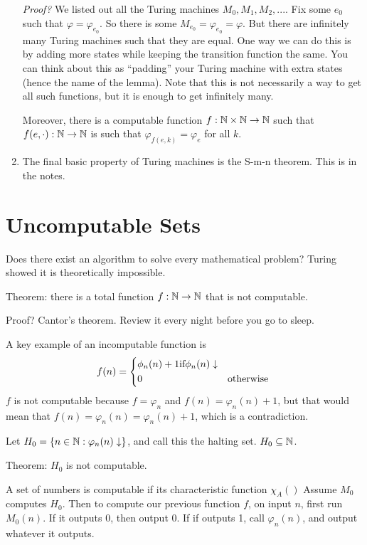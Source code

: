 \begin{enumerate}
    \textit{Proof?} We listed out all the Turing machines $M_0, M_1, M_2, ...$.
    Fix some $e_0$ such that $\varphi = \varphi_{e_0}$.
    So there is some $M_{e_0} = \varphi_{e_0} = \varphi$.
    But there are infinitely many Turing machines such that they are equal.
    One way we can do this is by adding more states while keeping the transition function the same.
    You can think about this as ``padding'' your Turing machine with extra states (hence the name of the lemma).
    Note that this is not necessarily a way to get all such functions, but it is enough to get infinitely many.

    Moreover, there is a computable function $f : \mathbb N \times \mathbb N \to \mathbb N$ such that $f(e, \cdot) : \mathbb N \to \mathbb N$ is such that $\varphi_{f(e, k)} = \varphi_e$ for all $k$.

    \item The final basic property of Turing machines is the S-m-n theorem.
    This is in the notes.

    
\end{enumerate}

\section{Uncomputable Sets}
Does there exist an algorithm to solve every mathematical problem?
Turing showed it is theoretically impossible.

Theorem: there is a total function $f : \mathbb N \to \mathbb N$ that is not computable.

Proof? Cantor's theorem.
Review it every night before you go to sleep.

A key example of an incomputable function is
$$f(n) = 
\begin{dcases*}
    \phi_n(n) + 1 
    \text{if} \phi_n(n)\downarrow \\
    0 
    & \text{otherwise}
\end{dcases*}$$
$f$ is not computable because $f = \varphi_n$ and $f(n) = \varphi_n(n) + 1$,
but that would mean that $f(n) = \varphi_n(n) = \varphi_n(n) + 1$, which is a contradiction.

Let $H_0 = \{n \in \mathbb N : \varphi_n(n) \downarrow\}$, and call this the halting set.
$H_0 \subseteq \mathbb N$.

Theorem: $H_0$ is not computable.

A set of numbers is computable if its characteristic function $\chi_A()$
Assume $M_0$ computes $H_0$.
Then to compute our previous function $f$, on input $n$, first run $M_0(n)$.
If it outputs 0, then output 0.
If if outputs 1, call $\varphi_n(n)$, and output whatever it outputs.


